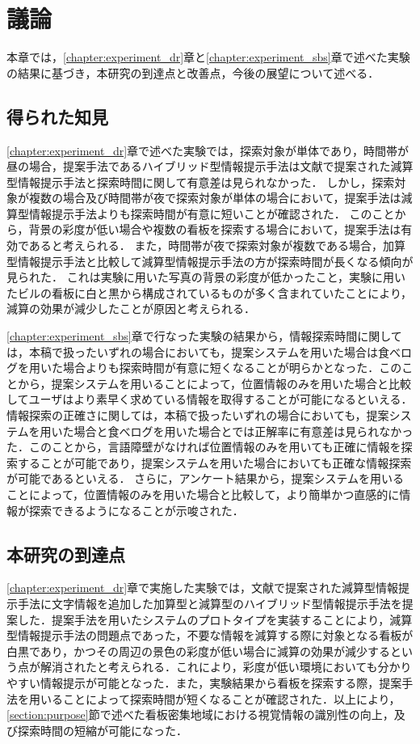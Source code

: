 \chapter{議論}
\label{chapter:discussion}
本章では，\ref{chapter:experiment_dr}章と\ref{chapter:experiment_sbs}章で述べた実験の結果に基づき，本研究の到達点と改善点，今後の展望について述べる．

\section{得られた知見}
\label{section:obtained_knowledge}
  \ref{chapter:experiment_dr}章で述べた実験では，探索対象が単体であり，時間帯が昼の場合，提案手法であるハイブリッド型情報提示手法は文献\cite{Fujita:2013}で提案された減算型情報提示手法と探索時間に関して有意差は見られなかった．
  しかし，探索対象が複数の場合及び時間帯が夜で探索対象が単体の場合において，提案手法は減算型情報提示手法よりも探索時間が有意に短いことが確認された．
  このことから，背景の彩度が低い場合や複数の看板を探索する場合において，提案手法は有効であると考えられる．
  また，時間帯が夜で探索対象が複数である場合，加算型情報提示手法と比較して減算型情報提示手法の方が探索時間が長くなる傾向が見られた．
  これは実験に用いた写真の背景の彩度が低かったこと，実験に用いたビルの看板に白と黒から構成されているものが多く含まれていたことにより，減算の効果が減少したことが原因と考えられる．

  \ref{chapter:experiment_sbs}章で行なった実験の結果から，情報探索時間に関しては，本稿で扱ったいずれの場合においても，提案システムを用いた場合は食べログを用いた場合よりも探索時間が有意に短くなることが明らかとなった．このことから，提案システムを用いることによって，位置情報のみを用いた場合と比較してユーザはより素早く求めている情報を取得することが可能になるといえる．
  情報探索の正確さに関しては，本稿で扱ったいずれの場合においても，提案システムを用いた場合と食べログを用いた場合とでは正解率に有意差は見られなかった．このことから，言語障壁がなければ位置情報のみを用いても正確に情報を探索することが可能であり，提案システムを用いた場合においても正確な情報探索が可能であるといえる．
  さらに，アンケート結果から，提案システムを用いることによって，位置情報のみを用いた場合と比較して，より簡単かつ直感的に情報が探索できるようになることが示唆された．

\section{本研究の到達点}
  \ref{chapter:experiment_dr}章で実施した実験では，文献\cite{Fujita:2013}で提案された減算型情報提示手法に文字情報を追加した加算型と減算型のハイブリッド型情報提示手法を提案した．提案手法を用いたシステムのプロトタイプを実装することにより，減算型情報提示手法の問題点であった，不要な情報を減算する際に対象となる看板が白黒であり，かつその周辺の景色の彩度が低い場合に減算の効果が減少するという点が解消されたと考えられる．これにより，彩度が低い環境においても分かりやすい情報提示が可能となった．また，実験結果から看板を探索する際，提案手法を用いることによって探索時間が短くなることが確認された．以上により，\ref{section:purpose}節で述べた看板密集地域における視覚情報の識別性の向上，及び探索時間の短縮が可能になった．

